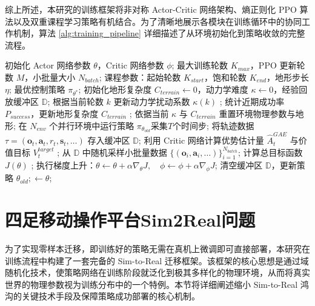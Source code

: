 综上所述，本研究的训练框架将非对称 Actor-Critic 网络架构、熵正则化 PPO 算法以及双重课程学习策略有机结合。为了清晰地展示各模块在训练循环中的协同工作机制，算法 \ref{alg:training_pipeline} 详细描述了从环境初始化到策略收敛的完整流程。
\begin{algorithm}[htbp]
    \caption{基于课程学习的四足移动操作平台全身控制 PPO 训练流程}
    \label{alg:training_pipeline}
    \begin{algorithmic}[1] %
        \REQUIRE 初始化 Actor 网络参数 $\theta$，Critic 网络参数 $\phi$;
        \REQUIRE 最大训练轮数 $K_{max}$，PPO 更新轮数 $M$，小批量大小 $N_{batch}$;
        \REQUIRE 课程参数：起始轮数 $K_{start}$，饱和轮数 $K_{end}$，地形步长 $\eta$;
        \ENSURE 最优控制策略 $\pi_{\theta^*}$;
        \STATE 初始化地形复杂度 $C_{terrain} \leftarrow 0$，动力学难度 $\kappa \leftarrow 0$，经验回放缓冲区 $\mathbb{D}$;
        \STATE 根据当前轮数 $k$ 更新动力学扰动系数 $\kappa(k)$ ;
        \STATE 统计近期成功率 $P_{success}$，更新地形复杂度 $C_{terrain}$ ;
        \ENDIF
        \STATE 依据当前 $\kappa$ 与 $C_{terrain}$ 重置环境物理参数与地形;
        \STATE 在 $N_{env}$ 个并行环境中运行策略 $\pi_{\theta_{old}}$采集$T$个时间步;
        \STATE 将轨迹数据 $\tau = (\mathbf{o}_t, \mathbf{a}_t, r_t, \mathbf{s}_t, \dots)$ 存入缓冲区 $\mathbb{D}$;
        \STATE 利用 Critic 网络计算优势估计量 $\hat{A}^{GAE}_t$ 与价值目标 $V_t^{target}$ ;
        \STATE 从 $\mathbb{D}$ 中随机采样小批量数据 $\{(\mathbf{o}_i, \mathbf{a}_i, \dots)\}_{i=1}^{N_{batch}}$;
        \STATE 计算总目标函数 $J(\theta)$ ;
        \STATE 执行梯度上升：$\theta \leftarrow \theta + \alpha \nabla_\theta J, \quad \phi \leftarrow \phi + \alpha \nabla_\phi J$;
        \ENDFOR
        \STATE 清空缓冲区 $\mathbb{D}$，更新策略 $\theta_{old}; \leftarrow \theta$;
        \ENDFOR
    \end{algorithmic}
\end{algorithm}

\section{四足移动操作平台Sim2Real问题}

为了实现零样本迁移，即训练好的策略无需在真机上微调即可直接部署，本研究在训练流程中构建了一套完备的 Sim-to-Real 迁移框架。该框架的核心思想是通过域随机化技术，使策略网络在训练阶段就泛化到极其多样化的物理环境，从而将真实世界的物理参数视为训练分布中的一个特例。本节将详细阐述缩小 Sim-to-Real 鸿沟的关键技术手段及保障策略成功部署的核心机制。

